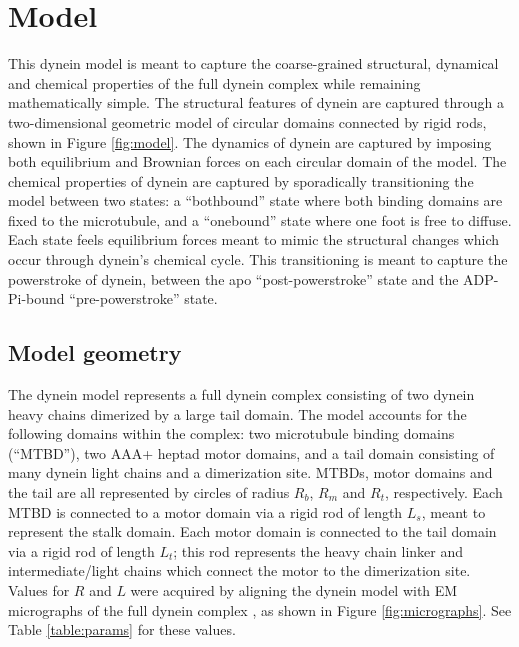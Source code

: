 \documentclass[9pt,twocolumn,twoside]{pnas-new}
\begin{document}
\section{Model}
This dynein model is meant to capture the coarse-grained structural, dynamical and chemical properties of the full dynein complex while remaining mathematically simple. The structural features of dynein are captured through a two-dimensional geometric model of circular domains connected by rigid rods, shown in Figure \ref{fig:model}. The dynamics of dynein are captured by imposing both equilibrium and Brownian forces on each circular domain of the model. The chemical properties of dynein are captured by sporadically transitioning the model between two states: a ``bothbound'' state where both binding domains are fixed to the microtubule, and a ``onebound'' state where one foot is free to diffuse. Each state feels equilibrium forces meant to mimic the structural changes which occur through dynein's chemical cycle. This transitioning is meant to capture the powerstroke of dynein, between the apo ``post-powerstroke'' state and the ADP-Pi-bound ``pre-powerstroke'' state.

\subsection*{Model geometry}
The dynein model represents a full dynein complex consisting of two dynein heavy chains dimerized by a large tail domain. The model accounts for the following domains within the complex: two microtubule binding domains (``MTBD''), two AAA+ heptad motor domains, and a tail domain consisting of many dynein light chains and a dimerization site. MTBDs, motor domains and the tail are all represented by circles of radius $R_b$, $R_m$ and $R_t$, respectively. Each MTBD is connected to a motor domain via a rigid rod of length $L_s$, meant to represent the stalk domain. Each motor domain is connected to the tail domain via a rigid rod of length $L_t$; this rod represents the heavy chain linker and intermediate/light chains which connect the motor to the dimerization site.\\

Values for $R$ and $L$ were acquired by aligning the dynein model with EM micrographs of the full dynein complex \cite{burgess-paper,grotjahn}, as shown in Figure \ref{fig:micrographs}. See Table \ref{table:params} for these values.\\
\end{document}
